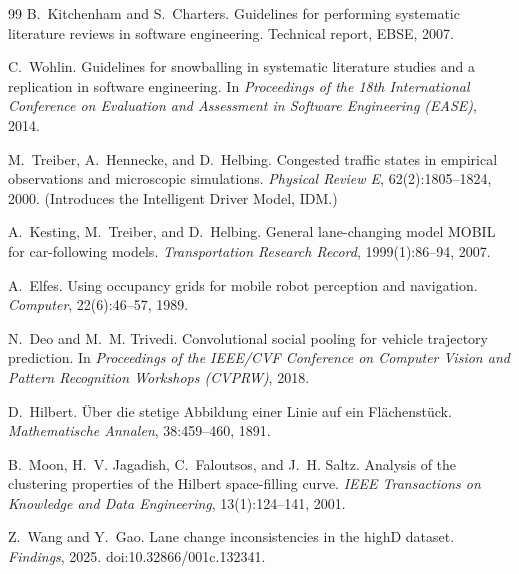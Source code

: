 \documentclass[12pt,a4paper,twoside,openright]{report}
\begin{document}
\begin{thebibliography}{99}
        B.~Kitchenham and S.~Charters.
        \newblock Guidelines for performing systematic literature reviews in software engineering.
        \newblock Technical report, EBSE, 2007.

        C.~Wohlin.
        \newblock Guidelines for snowballing in systematic literature studies and a replication in software engineering.
        \newblock In \emph{Proceedings of the 18th International Conference on Evaluation and Assessment in Software Engineering (EASE)}, 2014.

        M.~Treiber, A.~Hennecke, and D.~Helbing.
        \newblock Congested traffic states in empirical observations and microscopic simulations.
        \newblock \emph{Physical Review E}, 62(2):1805--1824, 2000.
        \newblock (Introduces the Intelligent Driver Model, IDM.)

        A.~Kesting, M.~Treiber, and D.~Helbing.
        \newblock General lane-changing model MOBIL for car-following models.
        \newblock \emph{Transportation Research Record}, 1999(1):86--94, 2007.

        A.~Elfes.
        \newblock Using occupancy grids for mobile robot perception and navigation.
        \newblock \emph{Computer}, 22(6):46--57, 1989.

        N.~Deo and M.~M. Trivedi.
        \newblock Convolutional social pooling for vehicle trajectory prediction.
        \newblock In \emph{Proceedings of the IEEE/CVF Conference on Computer Vision and Pattern Recognition Workshops (CVPRW)}, 2018.

        D.~Hilbert.
        \newblock \"Uber die stetige Abbildung einer Linie auf ein Fl\"achenst\"uck.
        \newblock \emph{Mathematische Annalen}, 38:459--460, 1891.

        B.~Moon, H.~V. Jagadish, C.~Faloutsos, and J.~H. Saltz.
        \newblock Analysis of the clustering properties of the Hilbert space-filling curve.
        \newblock \emph{IEEE Transactions on Knowledge and Data Engineering}, 13(1):124--141, 2001.

        Z.~Wang and Y.~Gao.
        \newblock Lane change inconsistencies in the highD dataset.
        \newblock \emph{Findings}, 2025.
        \newblock doi:10.32866/001c.132341.

    \end{thebibliography}
\end{document}

